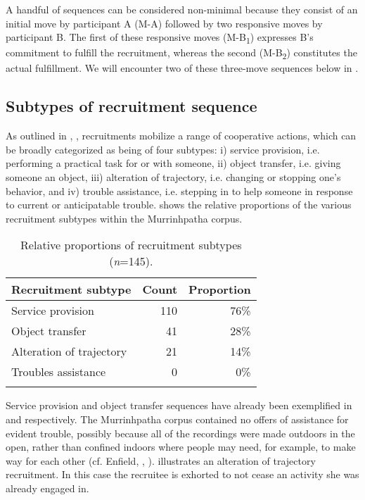 \documentclass[output=paper,nonflat,colorlinks,citecolor=brown]{langsci/langscibook}
\begin{document}
A handful of sequences can be considered non-minimal because they consist of an initial move by participant A (M-A) followed by two responsive moves by participant B. The first of these responsive moves (M-B\textsubscript{1}) expresses B’s commitment to fulfill the recruitment, whereas the second (M-B\textsubscript{2}) constitutes the actual fulfillment. We will encounter two of these three-move sequences below in .

\subsection{Subtypes of recruitment sequence}\label{sec:blythe:2.3}

As outlined in , , recruitments mobilize a range of cooperative actions, which can be broadly categorized as being of four subtypes: i) service provision, i.e. performing a practical task for or with someone, ii) object transfer, i.e. giving someone an object, iii) alteration of trajectory, i.e. changing or stopping one’s behavior, and iv) trouble assistance, i.e. stepping in to help someone in response to current or anticipatable trouble.  shows the relative proportions of the various recruitment subtypes within the Murrinhpatha corpus.

\begin{table}
\begin{tabularx}{.75\textwidth}{Xrr}
\lsptoprule
Recruitment subtype & Count & Proportion\\
\midrule
Service provision & 110 & 76\%\\
Object transfer & 41 & 28\%\\
Alteration of trajectory & 21 & 14\%\\
Troubles assistance & 0 & 0\%\\
\lspbottomrule
\end{tabularx}
\caption{Relative proportions of recruitment subtypes (\textit{n}=145).}
\label{tab:blythe:1}
\end{table}

Service provision and object transfer sequences have already been exemplified in  and  respectively. The Murrinhpatha corpus contained no offers of assistance for evident trouble, possibly because all of the recordings were made outdoors in the open, rather than confined indoors where people may need, for example, to make way for each other (cf. Enfield, , ).  illustrates an alteration of trajectory recruitment. In this case the recruitee is exhorted to not cease an activity she was already engaged in.
\end{document}

